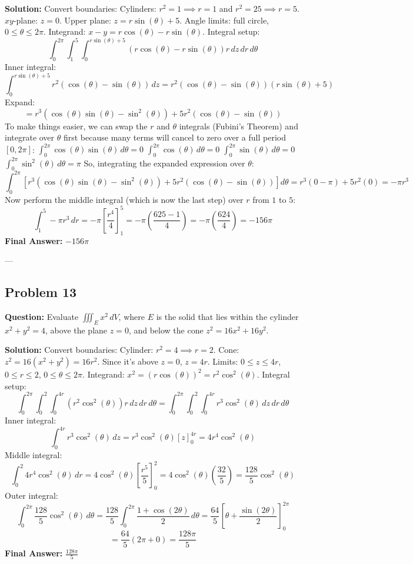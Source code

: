 \documentclass[11pt]{article}
\begin{document}
\textbf{Solution:}
Convert boundaries:
Cylinders: $r^2 = 1 \implies r=1$ and $r^2 = 25 \implies r=5$.
$xy$-plane: $z = 0$.
Upper plane: $z = r\sin(\theta) + 5$.
Angle limits: full circle, $0 \leq \theta \leq 2\pi$.
Integrand: $x - y = r\cos(\theta) - r\sin(\theta)$.
Integral setup:
\[ \int_0^{2\pi} \int_1^5 \int_0^{r\sin(\theta)+5} (r\cos(\theta) - r\sin(\theta))r \, dz \, dr \, d\theta \]
Inner integral:
\[ \int_0^{r\sin(\theta)+5} r^2(\cos(\theta) - \sin(\theta)) \, dz = r^2(\cos(\theta) - \sin(\theta))(r\sin(\theta) + 5) \]
Expand:
\[ = r^3(\cos(\theta)\sin(\theta) - \sin^2(\theta)) + 5r^2(\cos(\theta) - \sin(\theta)) \]
To make things easier, we can swap the $r$ and $\theta$ integrals (Fubini's Theorem) and integrate over $\theta$ first because many terms will cancel to zero over a full period $[0, 2\pi]$:
$\int_0^{2\pi} \cos(\theta)\sin(\theta) \, d\theta = 0$
$\int_0^{2\pi} \cos(\theta) \, d\theta = 0$
$\int_0^{2\pi} \sin(\theta) \, d\theta = 0$
$\int_0^{2\pi} \sin^2(\theta) \, d\theta = \pi$
So, integrating the expanded expression over $\theta$:
\[ \int_0^{2\pi} \left[ r^3(\cos(\theta)\sin(\theta) - \sin^2(\theta)) + 5r^2(\cos(\theta) - \sin(\theta)) \right] d\theta = r^3(0 - \pi) + 5r^2(0) = -\pi r^3 \]
Now perform the middle integral (which is now the last step) over $r$ from $1$ to $5$:
\[ \int_1^5 -\pi r^3 \, dr = -\pi \left[ \frac{r^4}{4} \right]_1^5 = -\pi \left( \frac{625 - 1}{4} \right) = -\pi \left( \frac{624}{4} \right) = -156\pi \]
\textbf{Final Answer:} $-156\pi$

---

\subsection*{Problem 13}
\textbf{Question:} Evaluate $\iiint_E x^2 \, dV$, where $E$ is the solid that lies within the cylinder $x^2 + y^2 = 4$, above the plane $z = 0$, and below the cone $z^2 = 16x^2 + 16y^2$.

\textbf{Solution:}
Convert boundaries:
Cylinder: $r^2 = 4 \implies r = 2$.
Cone: $z^2 = 16(x^2 + y^2) = 16r^2$. Since it's above $z=0$, $z = 4r$.
Limits: $0 \leq z \leq 4r$, $0 \leq r \leq 2$, $0 \leq \theta \leq 2\pi$.
Integrand: $x^2 = (r\cos(\theta))^2 = r^2\cos^2(\theta)$.
Integral setup:
\[ \int_0^{2\pi} \int_0^2 \int_0^{4r} (r^2\cos^2(\theta))r \, dz \, dr \, d\theta = \int_0^{2\pi} \int_0^2 \int_0^{4r} r^3\cos^2(\theta) \, dz \, dr \, d\theta \]
Inner integral:
\[ \int_0^{4r} r^3\cos^2(\theta) \, dz = r^3\cos^2(\theta) [z]_0^{4r} = 4r^4\cos^2(\theta) \]
Middle integral:
\[ \int_0^2 4r^4\cos^2(\theta) \, dr = 4\cos^2(\theta) \left[ \frac{r^5}{5} \right]_0^2 = 4\cos^2(\theta) \left(\frac{32}{5}\right) = \frac{128}{5}\cos^2(\theta) \]
Outer integral:
\[ \int_0^{2\pi} \frac{128}{5}\cos^2(\theta) \, d\theta = \frac{128}{5} \int_0^{2\pi} \frac{1 + \cos(2\theta)}{2} \, d\theta = \frac{64}{5} \left[ \theta + \frac{\sin(2\theta)}{2} \right]_0^{2\pi} \]
\[ = \frac{64}{5} (2\pi + 0) = \frac{128\pi}{5} \]
\textbf{Final Answer:} $\frac{128\pi}{5}$
\end{document}
